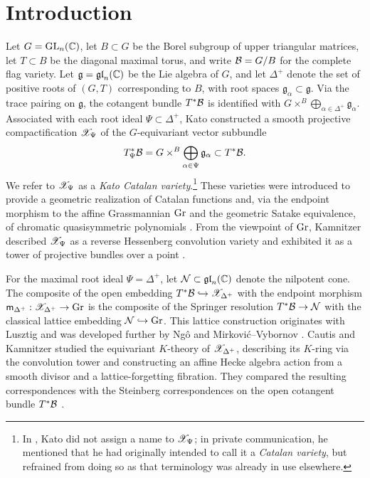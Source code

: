 \section{Introduction}\label{sec_intro}

Let $G=\mathrm{GL}_n(\mathbb C)$, let $B\subset G$ be the Borel subgroup of upper triangular matrices, let $T\subset B$ be the diagonal maximal torus, and write $\mathcal B=G/B$ for the complete flag variety. Let $\mathfrak g=\mathfrak{gl}_n(\mathbb C)$ be the Lie algebra of $G$, and let $\Delta^+$ denote the set of positive roots of $(G,T)$ corresponding to $B$, with root spaces $\mathfrak g_\alpha\subset\mathfrak g$. Via the trace pairing on $\mathfrak g$, the cotangent bundle $T^*\mathcal B$ is identified with $G\times^B\bigoplus_{\alpha\in\Delta^+}\mathfrak g_\alpha$. Associated with each root ideal $\Psi\subset\Delta^+$, Kato \cite[Theorems~3.10 and 4.4]{kato2023geometric} constructed a smooth projective compactification $\mathscr X_\Psi$ of the $G$-equivariant vector subbundle
\[
 T^*_\Psi\mathcal B=G\times^B\bigoplus_{\alpha\in\Psi}\mathfrak g_\alpha\subset T^*\mathcal B.
\]
We refer to $\mathscr X_\Psi$ as a \emph{Kato Catalan variety}.\footnote{In \cite{kato2023geometric}, Kato did not assign a name to $\mathscr X_\Psi$; in private communication, he mentioned that he had originally intended to call it a \emph{Catalan variety}, but refrained from doing so as that terminology was already in use elsewhere.} These varieties were introduced to provide a geometric realization of Catalan functions and, via the endpoint morphism to the affine Grassmannian $\mathrm{Gr}$ and the geometric Satake equivalence, of chromatic quasisymmetric polynomials \cite{kato2023geometric,kato2024geometric,kamnitzer2024fixed}. From the viewpoint of $\mathrm{Gr}$, Kamnitzer described $\mathscr X_\Psi$ as a reverse Hessenberg convolution variety and exhibited it as a tower of projective bundles over a point \cite[Proposition~2.1 and Remark~2.3]{kamnitzer2024fixed}.

For the maximal root ideal $\Psi=\Delta^+$, let $\mathcal N\subset\mathfrak{gl}_n(\mathbb C)$ denote the nilpotent cone. The composite of the open embedding $T^*\mathcal B\hookrightarrow\mathscr X_{\Delta^+}$ with the endpoint morphism $\mathsf m_{\Delta^+}:\mathscr X_{\Delta^+}\to\mathrm{Gr}$ is the composite of the Springer resolution $T^*\mathcal B\to\mathcal N$ with the classical lattice embedding $\mathcal N\hookrightarrow\mathrm{Gr}$. This lattice construction originates with Lusztig \cite{lusztig1981green} and was developed further by Ng\^o \cite[Lemma~2.3.1]{ngo1999faisceaux} and Mirkovi\'c--Vybornov \cite[Theorem~3.1 and \S3.3]{mirkovic2003quiver}.
Cautis and Kamnitzer \cite{cautis2018quantum} studied the equivariant $K$-theory of $\mathscr X_{\Delta^+}$, describing its $K$-ring via the convolution tower and constructing an affine Hecke algebra action from a smooth divisor and a lattice-forgetting fibration.
They compared the resulting correspondences with the Steinberg correspondences on the open cotangent bundle $T^*\mathcal B$ \cite[\S11]{cautis2018quantum}.

